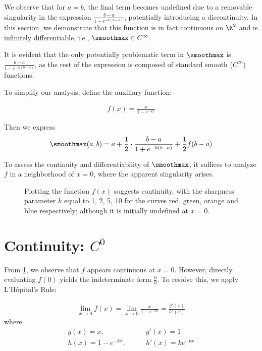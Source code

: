 We observe that for $a = b$, the final term becomes undefined due to a removable singularity in the expression $\frac{b - a}{1 - e^{-k(b - a)}}$, potentially introducing a discontinuity. In this section, we demonstrate that this function is in fact continuous on $\R^2$ and is infinitely differentiable, i.e., $\smoothmax \in C^\infty$.

It is evident that the only potentially problematic term in $\smoothmax$ is $\frac{b - a}{1 - e^{-k(b - a)}}$, as the rest of the expression is composed of standard smooth ($C^\infty$) functions.

To simplify our analysis, define the auxiliary function:

\begin{align}
    f(x) = \frac{x}{1 - e^{-kx}}
\end{align}

Then we express
\begin{align}
    \smoothmax(a, b) = a + \frac{1}{2} \cdot \frac{b - a}{1 + e^{-k(b - a)}} + \frac{1}{2} f(b - a)
\end{align}

To assess the continuity and differentiability of $\smoothmax$, it suffices to analyze $f$ in a neighborhood of $x = 0$, where the apparent singularity arises.

\begin{figure}
    \caption[Plot of $f(x)$]{Plotting the function $f(x)$ suggests continuity, with the sharpness parameter $k$ equal to 1, 2, 5, 10 for the curves red, green, orange and blue respectively; although it is initially undefined at $x = 0$.}
    \label{fig:smoothmax-f-plot}
\end{figure}

\section{Continuity: $C^0$}

From \cref{fig:smoothmax-f-plot}, we observe that $f$ appears continuous at $x = 0$. However, directly evaluating $f(0)$ yields the indeterminate form $\frac{0}{0}$. To resolve this, we apply L'Hôpital's Rule:

\begin{align}
    \lim_{x \to 0} f(x) = \lim_{x \to 0} \frac{x}{1 - e^{-kx}} = \frac{g'(x)}{h'(x)}
\end{align}
where
\begin{align}
    g(x) = x, \quad & \quad g'(x) = 1 \\
    h(x) = 1 - e^{-kx}, \quad & \quad h'(x) = k e^{-kx}
\end{align}

